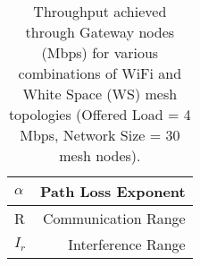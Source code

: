 \begin{table*}[t] 
\centering %
\begin{tabular}{|l|r|} %
\hline %
$\alpha$   & Path Loss Exponent     \\
\hline %
R & Communication Range \\
\hline %
$I_r$ & Interference Range \\
\hline %

\end{tabular} 
\label{tab:2channelcombination} 
\caption{Throughput achieved through Gateway nodes (Mbps) for various combinations of WiFi and White Space (WS) mesh topologies (Offered Load = 4 Mbps, Network Size = 30 mesh nodes).} %
\vspace{-0.1in}
\end{table*} 
